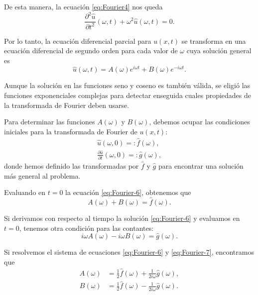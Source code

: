 \begin{ejemplo}
De esta manera, la ecuación \eqref{eq:Fourier4} nos queda
\begin{equation}
    \frac{\partial^2 \hat{u}}{\partial t^2}(\omega, t) + \omega^2 \hat{u}(\omega,t) = 0. \label{eq:Fourier-5}
\end{equation}

Por lo tanto, la ecuación diferencial parcial para $u(x,t)$ se transforma en una ecuación diferencial de segundo orden para cada valor de $\omega$ cuya solución general es
\begin{equation}
    \hat{u}(\omega,t) = A(\omega) e^{i\omega t} + B(\omega) e^{-i\omega t}. \label{eq:Fourier-6}
\end{equation}

Aunque la solución en las funciones seno y coseno es también válida, se eligió las funciones exponenciales complejas para detectar enseguida cuales propiedades de la transformada de Fourier deben usarse.

Para determinar las funciones $A(\omega)$ y $B(\omega)$, debemos ocupar las condiciones iniciales para la transformada de Fourier de $u(x,t)$:
\begin{align}
    \hat{u}(\omega,0) =: \hat{f}(\omega), \\
    \frac{\partial \hat{u}}{\partial t} (\omega,0) =: \hat{g}(\omega),
\end{align}
donde hemos definido las transformadas por $\hat{f}$ y $\hat{g}$ para encontrar una solución más general al problema.

Evaluando en $t = 0$ la ecuación \eqref{eq:Fourier-6}, obtenemos que
\begin{equation}
    A(\omega) + B(\omega) = \hat{f}(\omega). \label{eq:Fourier-6}
\end{equation}

Si derivamos con respecto al tiempo la solución \eqref{eq:Fourier-6} y evaluamos en $t = 0$, tenemos otra condición para las contantes:
\begin{equation}
   i\omega A(\omega) - i\omega B(\omega) = \hat{g}(\omega). \label{eq:Fourier-7}
\end{equation}

Si resolvemos el sistema de ecuaciones \eqref{eq:Fourier-6} y \eqref{eq:Fourier-7}, encontramos que
\begin{align}
    A(\omega) &= \frac{1}{2} \hat{f}(\omega) + \frac{1}{2i\omega} \hat{g}(\omega),  \label{eq:Fourier-8} \\
    B(\omega) &= \frac{1}{2} \hat{f}(\omega) - \frac{1}{2i\omega} \hat{g}(\omega). \label{eq:Fourier-9}
\end{align}


\end{ejemplo}
